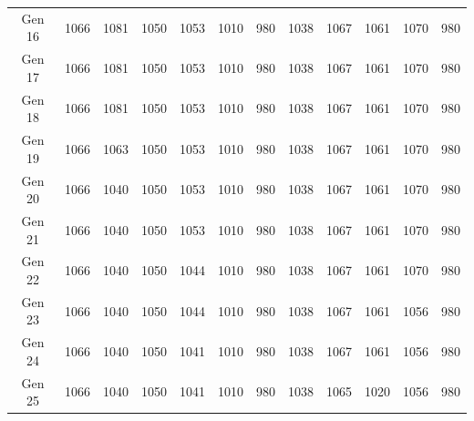 \documentclass[12pt]{article}
\begin{document}
\begin{table}[h]
\begin{adjustbox}{max width=1\textwidth}
\begin{tabular}{*{12}{c}}
            Gen 16 & 1066 & 1081 & 1050 & 1053 & 1010 & 980 & 1038 & 1067 & 1061 & 1070 & 980 \\
            Gen 17 & 1066 & 1081 & 1050 & 1053 & 1010 & 980 & 1038 & 1067 & 1061 & 1070 & 980 \\
            Gen 18 & 1066 & 1081 & 1050 & 1053 & 1010 & 980 & 1038 & 1067 & 1061 & 1070 & 980 \\
            Gen 19 & 1066 & 1063 & 1050 & 1053 & 1010 & 980 & 1038 & 1067 & 1061 & 1070 & 980 \\
            Gen 20 & 1066 & 1040 & 1050 & 1053 & 1010 & 980 & 1038 & 1067 & 1061 & 1070 & 980 \\
            Gen 21 & 1066 & 1040 & 1050 & 1053 & 1010 & 980 & 1038 & 1067 & 1061 & 1070 & 980 \\
            Gen 22 & 1066 & 1040 & 1050 & 1044 & 1010 & 980 & 1038 & 1067 & 1061 & 1070 & 980 \\
            Gen 23 & 1066 & 1040 & 1050 & 1044 & 1010 & 980 & 1038 & 1067 & 1061 & 1056 & 980 \\
            Gen 24 & 1066 & 1040 & 1050 & 1041 & 1010 & 980 & 1038 & 1067 & 1061 & 1056 & 980 \\
            Gen 25 & 1066 & 1040 & 1050 & 1041 & 1010 & 980 & 1038 & 1065 & 1020 & 1056 & 980 \\
            \bottomrule
        \end{tabular}
    \end{adjustbox}
\end{table}

\end{document}
